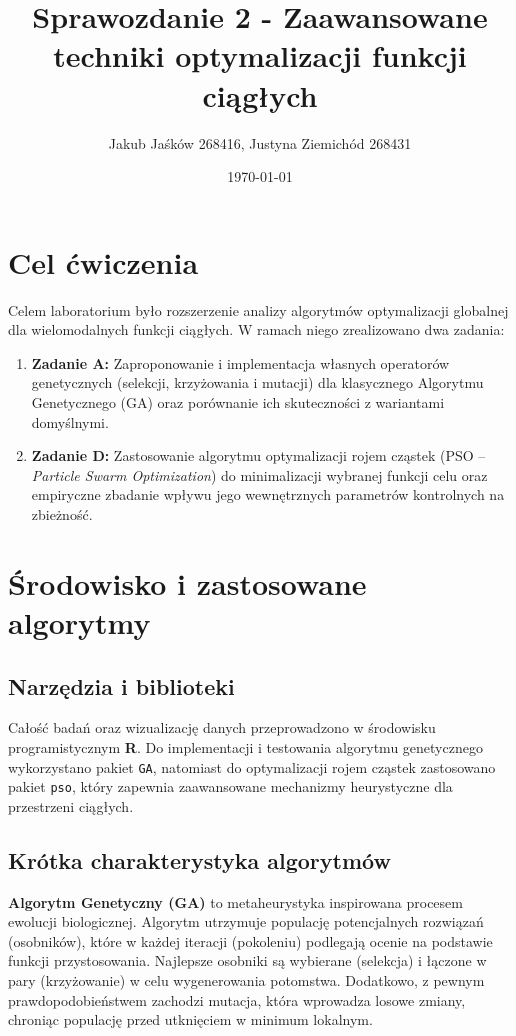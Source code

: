 \documentclass[12pt, a4paper]{article}
\title{Sprawozdanie 2 - Zaawansowane techniki optymalizacji funkcji ciągłych}
\author{Jakub Jaśków 268416, Justyna Ziemichód 268431}
\date{\today}
\begin{document}
\maketitle
\tableofcontents
\newpage

\section{Cel ćwiczenia}
Celem laboratorium było rozszerzenie analizy algorytmów optymalizacji globalnej dla wielomodalnych funkcji ciągłych.
W ramach niego zrealizowano dwa zadania:
\begin{enumerate}
    \item \textbf{Zadanie A:} Zaproponowanie i implementacja własnych operatorów genetycznych (selekcji, krzyżowania i mutacji) dla klasycznego Algorytmu Genetycznego (GA) oraz porównanie ich skuteczności z wariantami domyślnymi.
    \item \textbf{Zadanie D:} Zastosowanie algorytmu optymalizacji rojem cząstek (PSO -- \textit{Particle Swarm Optimization}) do minimalizacji wybranej funkcji celu oraz empiryczne zbadanie wpływu jego wewnętrznych parametrów kontrolnych na zbieżność.
\end{enumerate}

\section{Środowisko i zastosowane algorytmy}

\subsection*{Narzędzia i biblioteki}

Całość badań oraz wizualizację danych przeprowadzono w środowisku programistycznym \textbf{R}. Do implementacji i testowania algorytmu genetycznego wykorzystano pakiet \texttt{GA}, natomiast do optymalizacji rojem cząstek zastosowano pakiet \texttt{pso}, który zapewnia zaawansowane mechanizmy heurystyczne dla przestrzeni ciągłych.

\subsection*{Krótka charakterystyka algorytmów}

\textbf{Algorytm Genetyczny (GA)} to metaheurystyka inspirowana procesem ewolucji biologicznej. Algorytm utrzymuje populację potencjalnych rozwiązań (osobników), które w każdej iteracji (pokoleniu) podlegają ocenie na podstawie funkcji przystosowania. Najlepsze osobniki są wybierane (selekcja) i łączone w pary (krzyżowanie) w celu wygenerowania potomstwa. Dodatkowo, z pewnym prawdopodobieństwem zachodzi mutacja, która wprowadza losowe zmiany, chroniąc populację przed utknięciem w minimum lokalnym.
\end{document}
